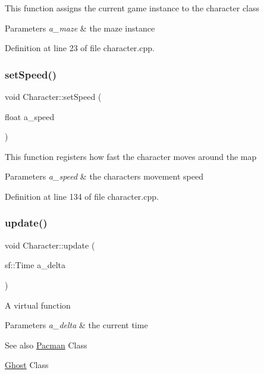 This function assigns the current game instance to the character class


\begin{DoxyParams}{Parameters}
{\em a\+\_\+maze} & the maze instance \\
\hline
\end{DoxyParams}


Definition at line 23 of file character.\+cpp.

\mbox{\label{class_character_a37068c523c733698c7f7ad587ccc66a0}} 
\subsubsection{\texorpdfstring{set\+Speed()}{setSpeed()}}
{\footnotesize\ttfamily void Character\+::set\+Speed (\begin{DoxyParamCaption}\item[{float}]{a\+\_\+speed }\end{DoxyParamCaption})}

This function registers how fast the character moves around the map


\begin{DoxyParams}{Parameters}
{\em a\+\_\+speed} & the character\textquotesingle{}s movement speed \\
\hline
\end{DoxyParams}


Definition at line 134 of file character.\+cpp.

\mbox{\label{class_character_a89b72b507971ba8648909980d045ed06}} 
\subsubsection{\texorpdfstring{update()}{update()}}
{\footnotesize\ttfamily void Character\+::update (\begin{DoxyParamCaption}\item[{sf\+::\+Time}]{a\+\_\+delta }\end{DoxyParamCaption})\hspace{0.3cm}{\ttfamily [virtual]}}

A virtual function


\begin{DoxyParams}{Parameters}
{\em a\+\_\+delta} & the current time \\
\hline
\end{DoxyParams}
\begin{DoxySeeAlso}{See also}
\hyperlink{class_pacman}{Pacman} Class 

\hyperlink{class_ghost}{Ghost} Class 
\end{DoxySeeAlso}


